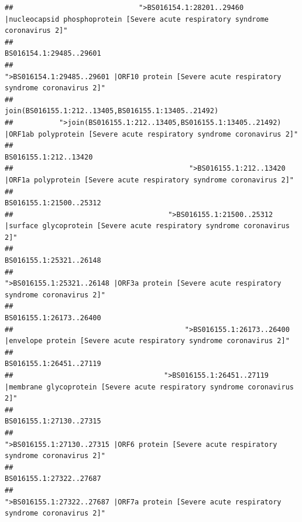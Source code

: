 \documentclass[
]{article}
\begin{document}
\begin{verbatim}
##                              ">BS016154.1:28201..29460 |nucleocapsid phosphoprotein [Severe acute respiratory syndrome coronavirus 2]" 
##                                                                                                                BS016154.1:29485..29601 
##                                            ">BS016154.1:29485..29601 |ORF10 protein [Severe acute respiratory syndrome coronavirus 2]" 
##                                                                                    join(BS016155.1:212..13405,BS016155.1:13405..21492) 
##           ">join(BS016155.1:212..13405,BS016155.1:13405..21492) |ORF1ab polyprotein [Severe acute respiratory syndrome coronavirus 2]" 
##                                                                                                                  BS016155.1:212..13420 
##                                          ">BS016155.1:212..13420 |ORF1a polyprotein [Severe acute respiratory syndrome coronavirus 2]" 
##                                                                                                                BS016155.1:21500..25312 
##                                     ">BS016155.1:21500..25312 |surface glycoprotein [Severe acute respiratory syndrome coronavirus 2]" 
##                                                                                                                BS016155.1:25321..26148 
##                                            ">BS016155.1:25321..26148 |ORF3a protein [Severe acute respiratory syndrome coronavirus 2]" 
##                                                                                                                BS016155.1:26173..26400 
##                                         ">BS016155.1:26173..26400 |envelope protein [Severe acute respiratory syndrome coronavirus 2]" 
##                                                                                                                BS016155.1:26451..27119 
##                                    ">BS016155.1:26451..27119 |membrane glycoprotein [Severe acute respiratory syndrome coronavirus 2]" 
##                                                                                                                BS016155.1:27130..27315 
##                                             ">BS016155.1:27130..27315 |ORF6 protein [Severe acute respiratory syndrome coronavirus 2]" 
##                                                                                                                BS016155.1:27322..27687 
##                                            ">BS016155.1:27322..27687 |ORF7a protein [Severe acute respiratory syndrome coronavirus 2]" 

\end{verbatim}
\end{document}

